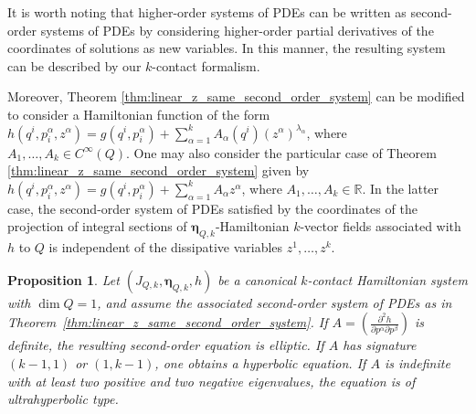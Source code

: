\documentclass[11pt,a4paper]{article}
\theoremstyle{plain} \newtheorem{theorem}{Theorem}[section] \newtheorem{proposition}[theorem]{Proposition} \newtheorem{corollary}[theorem]{Corollary} \newtheorem{lemma}[theorem]{Lemma} \theoremstyle{definition} \newtheorem{definition}[theorem]{Definition} \theoremstyle{remark} \newtheorem{remark}[theorem]{Remark} \newtheorem{example}[theorem]{Example} %
\begin{document}
It is worth noting that higher-order systems of PDEs can be written as second-order systems of PDEs by considering higher-order partial derivatives of the coordinates of solutions as new variables. In this manner, the resulting system can be described by our $k$-contact formalism.

Moreover,  Theorem \ref{thm:linear_z_same_second_order_system} can be modified to consider a Hamiltonian function of the form \(h(q^i,p_i^\alpha,z^\alpha)=g(q^i,p_i^\alpha)+\sum_{\alpha=1}^k A_\alpha(q^i)(z^\alpha)^{\lambda_\alpha}\), where \(A_1,\dots,A_k\in C^\infty(Q)\). One may also consider the particular case of Theorem \ref{thm:linear_z_same_second_order_system} given by \(h(q^i,p_i^\alpha,z^\alpha)=g(q^i,p_i^\alpha)+\sum_{\alpha=1}^k A_\alpha z^\alpha\), where \(A_1,\dots,A_k\in \mathbb{R}\). In the latter case, the second-order system of PDEs satisfied by the coordinates of the projection of integral sections of \(\bm\eta_{Q,k}\)-Hamiltonian $k$-vector fields associated with \(h\) to $Q$ is independent of the dissipative variables \(z^1,\dots,z^k\).

\begin{proposition}\label{prop:regularity_not_hyperbolicity}
Let \((J_{Q,k},\bm\eta_{Q,k},h)\) be a canonical \(k\)-contact Hamiltonian system with $\dim Q=1$, and assume  the associated  second-order system of PDEs as in Theorem~\ref{thm:linear_z_same_second_order_system}.   
If $A=\left(\frac{\partial^2 h}{\partial p^\alpha\partial p^\beta}\right)$ is definite, the resulting second-order equation is elliptic. If $A$ has signature $(k-1,1)$ or $(1,k-1)$, one obtains a hyperbolic equation. If $A$ is indefinite with at least two positive and two negative eigenvalues, the equation is of ultrahyperbolic type.  

\end{proposition} 
 
\end{document}
